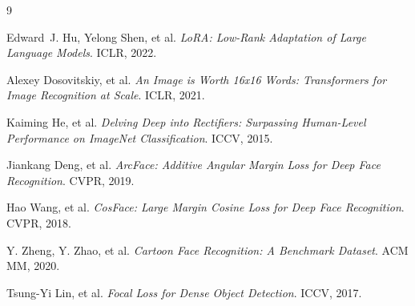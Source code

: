 \documentclass[11pt]{article}
\begin{document}
\begin{thebibliography}{9}\setlength{\itemsep}{2pt}

Edward~J. Hu, Yelong Shen, et al.
\newblock \emph{LoRA: Low-Rank Adaptation of Large Language Models}.
\newblock ICLR, 2022.

Alexey Dosovitskiy, et al.
\newblock \emph{An Image is Worth 16x16 Words: Transformers for Image Recognition at Scale}.
\newblock ICLR, 2021.

Kaiming He, et al.
\newblock \emph{Delving Deep into Rectifiers: Surpassing Human-Level Performance on ImageNet Classification}.
\newblock ICCV, 2015.

Jiankang Deng, et al.
\newblock \emph{ArcFace: Additive Angular Margin Loss for Deep Face Recognition}.
\newblock CVPR, 2019.

Hao Wang, et al.
\newblock \emph{CosFace: Large Margin Cosine Loss for Deep Face Recognition}.
\newblock CVPR, 2018.

Y. Zheng, Y. Zhao, et al.
\newblock \emph{Cartoon Face Recognition: A Benchmark Dataset}.
\newblock ACM MM, 2020.

Tsung-Yi Lin, et al.
\newblock \emph{Focal Loss for Dense Object Detection}.
\newblock ICCV, 2017.

\end{thebibliography}
\end{document}
